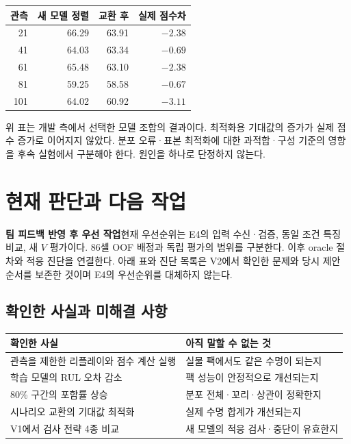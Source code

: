 \documentclass[11pt,a4paper]{article}
\begin{document}
\begin{center}
\begin{tabular}{rrrr}
\toprule
관측 & 새 모델 정렬 & 교환 후 & 실제 점수차 \\
\midrule
21 & 66.29 & 63.91 & $-2.38$ \\
41 & 64.03 & 63.34 & $-0.69$ \\
61 & 65.48 & 63.10 & $-2.38$ \\
81 & 59.25 & 58.58 & $-0.67$ \\
101 & 64.02 & 60.92 & $-3.11$ \\
\bottomrule
\end{tabular}
\end{center}
위 표는 개발 측에서 선택한 모델 조합의 결과이다. 최적화용 기대값의 증가가 실제 점수 증가로 이어지지 않았다. 분포 오류·표본 최적화에 대한 과적합·구성 기준의 영향을 후속 실험에서 구분해야 한다. 원인을 하나로 단정하지 않는다.

\clearpage
\section{현재 판단과 다음 작업}
\textbf{팀 피드백 반영 후 우선 작업}\quad 현재 우선순위는 E4의 입력 수신·검증, 동일 조건 특징 비교, 새 $V$ 평가이다. 86셀 OOF 배정과 독립 평가의 범위를 구분한다. 이후 oracle 절차와 적응 진단을 연결한다. 아래 표와 진단 목록은 V2에서 확인한 문제와 당시 제안 순서를 보존한 것이며 E4의 우선순위를 대체하지 않는다.
\subsection*{확인한 사실과 미해결 사항}
\begin{tabular}{p{.43\linewidth}p{.47\linewidth}}
\toprule
확인한 사실 & 아직 말할 수 없는 것 \\
\midrule
관측을 제한한 리플레이와 점수 계산 실행 & 실물 팩에서도 같은 수명이 되는지 \\
학습 모델의 RUL 오차 감소 & 팩 성능이 안정적으로 개선되는지 \\
80\% 구간의 포함률 상승 & 분포 전체·꼬리·상관이 정확한지 \\
시나리오 교환의 기대값 최적화 & 실제 수명 합계가 개선되는지 \\
V1에서 검사 전략 4종 비교 & 새 모델의 적응 검사·중단이 유효한지 \\
\bottomrule
\end{tabular}
\end{document}
